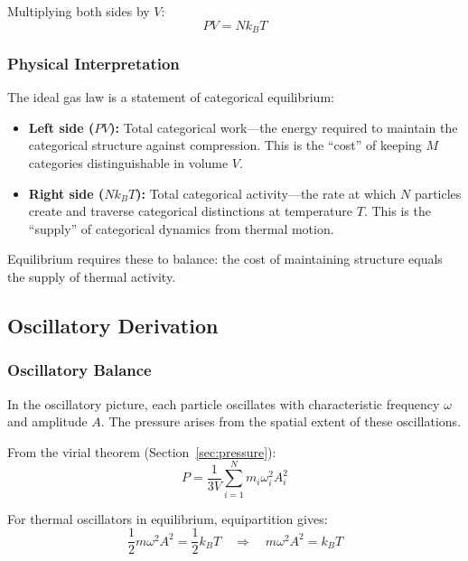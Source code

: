 Multiplying both sides by $V$:
\begin{equation}
\boxed{PV = Nk_B T}
\end{equation}

\subsubsection{Physical Interpretation}

The ideal gas law is a statement of categorical equilibrium:

\begin{itemize}
\item \textbf{Left side ($PV$):} Total categorical work—the energy required to maintain the categorical structure against compression. This is the ``cost'' of keeping $M$ categories distinguishable in volume $V$.

\item \textbf{Right side ($Nk_B T$):} Total categorical activity—the rate at which $N$ particles create and traverse categorical distinctions at temperature $T$. This is the ``supply'' of categorical dynamics from thermal motion.
\end{itemize}

Equilibrium requires these to balance: the cost of maintaining structure equals the supply of thermal activity.

\subsection{Oscillatory Derivation}

\subsubsection{Oscillatory Balance}

In the oscillatory picture, each particle oscillates with characteristic frequency $\omega$ and amplitude $A$. The pressure arises from the spatial extent of these oscillations.

From the virial theorem (Section~\ref{sec:pressure}):
\begin{equation}
P = \frac{1}{3V}\sum_{i=1}^{N} m_i \omega_i^2 A_i^2
\end{equation}

For thermal oscillators in equilibrium, equipartition gives:
\begin{equation}
\frac{1}{2}m\omega^2 A^2 = \frac{1}{2}k_B T \quad \Rightarrow \quad m\omega^2 A^2 = k_B T
\end{equation}

